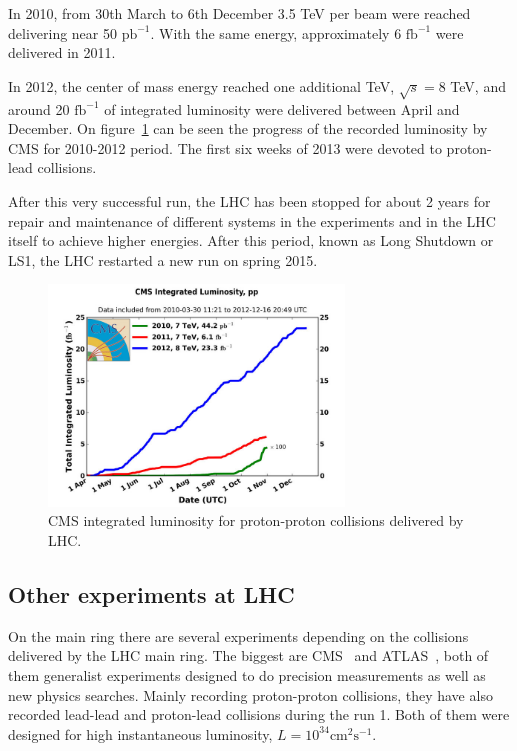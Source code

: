 In 2010, from 30th March to 6th December 3.5 TeV per beam were reached delivering near 50 $\text{pb}^{-1}$. With the same energy, approximately 6 $\text{fb}^{-1}$ were delivered in 2011. 

In 2012, the center of mass energy reached one additional TeV, $\sqrt{s}=8$ TeV, and around 20 $\text{fb}^{-1}$ of integrated luminosity were delivered between April and December. On figure~\ref{fig:CMSlumi} can be seen the progress of the recorded luminosity by CMS for 2010-2012 period. The first six weeks of 2013 were devoted to proton-lead collisions.

After this very successful run, the LHC has been stopped for about 2 years for repair and maintenance of different systems in the experiments and in the LHC itself to achieve higher energies. After this period, known as Long Shutdown  or LS1, the LHC restarted a new run on spring 2015.

\begin{figure}[!Hhtbp]
  \begin{center}
    \includegraphics[width=0.7\textwidth]{figs/cms-int-10to12.jpg}
    \caption{CMS integrated luminosity for proton-proton collisions delivered by LHC. }
    \label{fig:CMSlumi}
  \end{center}
\end{figure}

\subsection{Other experiments at LHC}
\label{sec:expers}

On the main ring there are several experiments depending on the collisions delivered by the LHC main ring. The biggest are CMS~\cite{Bayatian:922757} and ATLAS~\cite{ATLAS:1999}, both of them generalist experiments designed to do precision measurements as well as new physics searches. Mainly recording proton-proton collisions, they have also recorded lead-lead and proton-lead collisions during the run 1. Both of them were designed for high instantaneous luminosity, $L = 10^{34}\text{cm}^{2}\text{s}^{-1}$.

